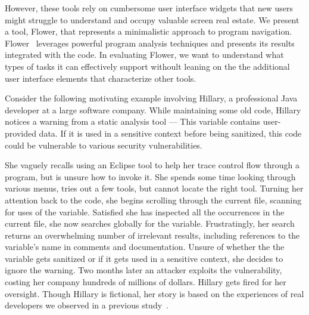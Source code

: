 \documentclass[conference]{IEEEtran}
\newcommand{\toolName}{Flower}
\begin{document}
However, these tools rely on cumbersome user interface widgets that new users might struggle to understand and occupy valuable screen real estate.
We present a tool, \toolName, that represents a minimalistic approach to program navigation.
\toolName~ leverages powerful program analysis techniques and presents its results integrated with the code.
In evaluating \toolName, we want to understand what types of tasks it can effectively support withoult leaning on the the additional user interface elements that characterize other tools.


Consider the following motivating example involving Hillary, a professional Java developer at a large software company.
While maintaining some old code, Hillary notices a warning from a static analysis tool --- This variable contains user-provided data. If it is used in a sensitive context before being sanitized, this code could be vulnerable to various security vulnerabilities.

She vaguely recalls using an Eclipse tool to help her trace control flow through a program, but is unsure how to invoke it.
She spends some time looking through various menus, tries out a few tools, but cannot locate the right tool.
Turning her attention back to the code, she begins scrolling through the current file, scanning for uses of the variable. 
Satisfied she has inspected all the occurrences in the current file, she now searches globally for the variable.
Frustratingly, her search returns an overwhelming number of irrelevant results, including references to the variable's name in comments and documentation.
Unsure of whether the the variable gets sanitized or if it gets used in a sensitive context, she decides to ignore the warning.
Two months later an attacker exploits the vulnerability, costing her company hundreds of millions of dollars. 
Hillary gets fired for her oversight. 
Though Hillary is fictional, her story is based on the experiences of real developers we observed in a previous study~\cite{Smith2015}.
\end{document}
